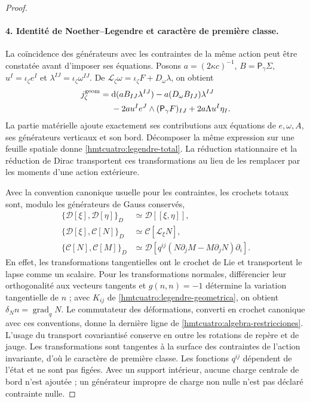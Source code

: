 \begin{proof}
\paragraph{4. Identité de Noether--Legendre et caractère de première classe.}
La coïncidence des générateurs avec les contraintes de la même action peut être constatée avant d’imposer ses équations. Posons \(a=(2\kappa c)^{-1}\), \(B=\mathsf P_\gamma\Sigma\), \(u^I=\iota_\zeta e^I\) et \(\lambda^{IJ}=\iota_\zeta\omega^{IJ}\). De \(\mathcal L_\zeta\omega=\iota_\zeta F+D_\omega\lambda\), on obtient
\begin{equation}
 \begin{split}
 j_\zeta^{\rm geom}
 ={}&\mathrm d(a B_{IJ}\lambda^{IJ})
   -a(D_\omega B_{IJ})\lambda^{IJ}\\
 &-2a u^Ie^J\wedge(\mathsf P_\gamma F)_{IJ}
       +2a\Lambda u^I\eta_I .
 \end{split}
 \label{hmtcuatro:noether-legendre}
\end{equation}
La partie matérielle ajoute exactement ses contributions aux équations de \(e,\omega,A\), ses générateurs verticaux et son bord. Décomposer la même expression sur une feuille spatiale donne \eqref{hmtcuatro:legendre-total}. La réduction stationnaire et la réduction de Dirac transportent ces transformations au lieu de les remplacer par les moments d’une action extérieure.

Avec la convention canonique usuelle pour les contraintes, les crochets totaux sont, modulo les générateurs de Gauss conservés,
\begin{equation}
 \begin{aligned}
 \{\mathcal D[\xi],\mathcal D[\eta]\}_D
    &\simeq\mathcal D[[\xi,\eta]],\\
 \{\mathcal D[\xi],\mathcal C[N]\}_D
    &\simeq\mathcal C[\mathcal L_\xi N],\\
 \{\mathcal C[N],\mathcal C[M]\}_D
    &\simeq\mathcal D[
       q^{ij}(N\partial_jM-M\partial_jN)\partial_i].
 \end{aligned}
 \label{hmtcuatro:algebra-restricciones}
\end{equation}
En effet, les transformations tangentielles ont le crochet de Lie et transportent le lapse comme un scalaire. Pour les transformations normales, différencier leur orthogonalité aux vecteurs tangents et \(g(n,n)=-1\) détermine la variation tangentielle de \(n\) ; avec \(K_{ij}\) de \eqref{hmtcuatro:legendre-geometrica}, on obtient \(\delta_N n=\operatorname{grad}_qN\). Le commutateur des déformations, converti en crochet canonique avec ces conventions, donne la dernière ligne de \eqref{hmtcuatro:algebra-restricciones}. L’usage du transport covariantisé conserve en outre les rotations de repère et de jauge. Les transformations sont tangentes à la surface des contraintes de l’action invariante, d’où le caractère de première classe. Les fonctions \(q^{ij}\) dépendent de l’état et ne sont pas figées. Avec un support intérieur, aucune charge centrale de bord n’est ajoutée ; un générateur impropre de charge non nulle n’est pas déclaré contrainte nulle.


\end{proof}
